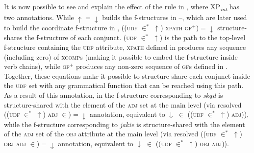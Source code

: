 \documentclass[output=paper]{../langscibook}
\begin{document}
It is now possible to see and explain the effect of the rule in
, where XP\textsubscript{\textit{int}} has two annotations. While \textsc{$\uparrow=\downarrow$}
builds the f-structures in
–,
which are later used to build the coordinate f-structure in
, (\textsc{(udf
  $\in^{*}$ $\uparrow$) xpath gf$^{+}$})$=\downarrow$ structure-shares
the f-structure of each conjunct. \textsc{(udf $\in^{*}$ $\uparrow$)}
is the path to the top-level f-structure containing the \textsc{udf} attribute,
\textsc{xpath} defined in  produces any sequence
(including zero) of \textsc{xcomp}s (making it possible to embed the
f-structure inside verb chains), while \textsc{gf$^{+}$} produces any non-zero
sequence of \textsc{gf}s defined in . Together,
these equations make it possible to structure-share each conjunct
inside the \textsc{udf} set with any grammatical function that can be
reached using this path. As a result of this annotation, in
 the f-structure
\avm{\4} corresponding to \emph{skąd} is structure-shared with the
element of the \textsc{adj} set at the main level (via resolved \textsc{((udf $\in^{*}$ $\uparrow$) adj $\in$)$=\downarrow$} annotation, equivalent to \textsc{$\downarrow$ $\in$ ((udf $\in^{*}$ $\uparrow$) adj)}), while the
f-structure \avm{\3} corresponding to \emph{jakie} is
structure-shared with the element of the \textsc{adj} set of the
\textsc{obj} attribute at the main level (via resolved \textsc{((udf $\in^{*}$ $\uparrow$) obj adj $\in$)$=\downarrow$} annotation, equivalent to \textsc{$\downarrow$ $\in$ ((udf $\in^{*}$ $\uparrow$) obj adj)}).
\end{document}
